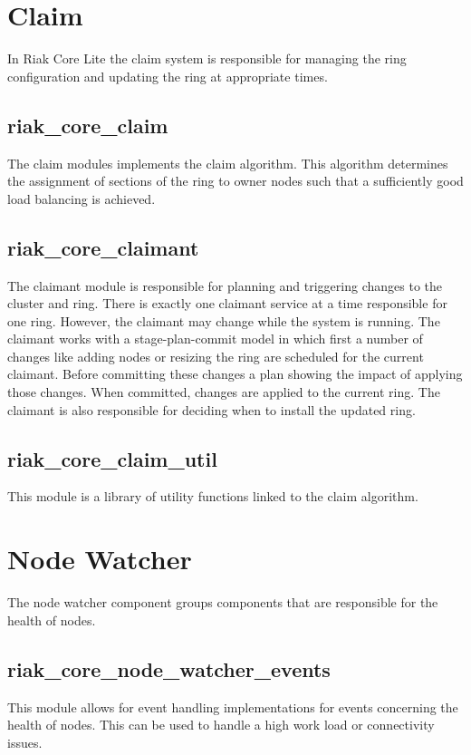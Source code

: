 \section{Claim}
	In Riak Core Lite the claim system is responsible for managing the ring configuration and updating the ring at appropriate times.
	\subsection{riak\_core\_claim}
		The claim modules implements the claim algorithm.
		This algorithm determines the assignment of sections of the ring to owner nodes such that a sufficiently good load balancing is achieved.
	
	\subsection{riak\_core\_claimant}
		The claimant module is responsible for planning and triggering changes to the cluster and ring.
		There is exactly one claimant service at a time responsible for one ring.
		However, the claimant may change while the system is running.
		The claimant works with a stage-plan-commit model in which first a number of changes like adding nodes or resizing the ring are scheduled for the current claimant.
		Before committing these changes a plan showing the impact of applying those changes.
		When committed, changes are applied to the current ring.
		The claimant is also responsible for deciding when to install the updated ring.
	
	\subsection{riak\_core\_claim\_util}
		This module is a library of utility functions linked to the claim algorithm.

\section{Node Watcher}
	The node watcher component groups components that are responsible for the health of nodes.
	\subsection{riak\_core\_node\_watcher\_events}
		This module allows for event handling implementations for events concerning the health of nodes.
		This can be used to handle a high work load or connectivity issues.
	
